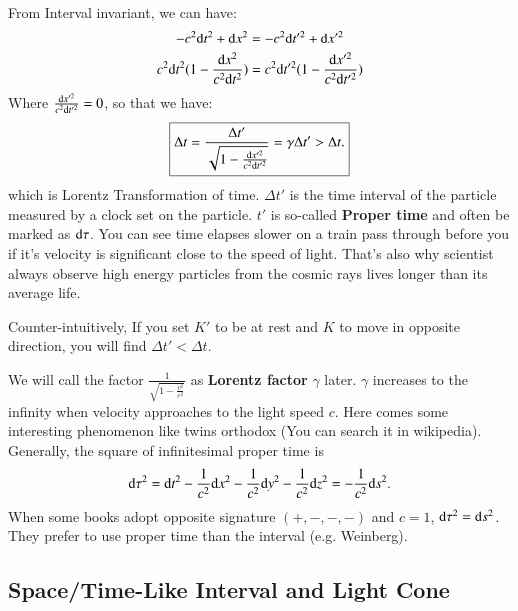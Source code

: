 \documentclass[openany,10pt]{book}
\theoremstyle{definition}
\theoremstyle{definition}
\theoremstyle{remark}
\begin{document}
From Interval invariant, we can have:
\begin{equation}
-c^2 {\rm d} t^2+{\rm d} x^2=-c^2{\rm d} t'^2+{\rm d} x'^2
\end{equation}
\begin{equation}
c^2{\rm d} t^2(1-\frac{{\rm d}x^2}{c^2 {\rm d}t^2})=c^2{\rm d}t'^2(1-\frac{{\rm d}x'^2}{c^2{\rm d}t'^2})
\end{equation}
Where $\frac{{\rm d}x'^2}{c^2{\rm d}t'^2}=0$, so that we have:
\begin{equation}\boxed{
\Delta t=\frac{\Delta t'}{\sqrt{1-\frac{{\rm d}x'^2}{c^2{\rm d}t'^2}}}=\gamma \Delta t'>\Delta t.}
\end{equation}
which is Lorentz Transformation of time. $\Delta t'$ is the time interval of the particle measured by a clock set on the particle. $t'$ is so-called {\bfseries Proper time} and often be marked as ${\rm d}\tau$.  You can see time elapses slower on a train pass through before you if it's velocity is significant close to the speed of light. That's also why scientist always observe high energy particles from the cosmic rays lives longer than its average life. 


Counter-intuitively, If you set $K'$ to be at rest and $K$ to move in opposite direction, you will find $\Delta t'<\Delta t$. 

We will call the factor $\frac1{\sqrt{1-\frac{v^2}{c^2}}}$ as {\bfseries Lorentz factor} $\gamma$ later. $\gamma$ increases to the infinity when velocity approaches to the light speed $c$.
Here comes some interesting phenomenon like twins orthodox (You can search it in wikipedia).\\
Generally, the square of infinitesimal proper time is 
\begin{equation}
    {\rm d} \tau^2={\rm d} t^2-\frac{1}{c^2}{\rm d} x^2-\frac{1}{c^2}{\rm d} y^2-\frac{1}{c^2}{\rm d} z^2=-\frac{1}{c^2}{\rm d}s^2.
\end{equation}
When some books adopt opposite signature $(+,-,-,-)$ and $c=1$, ${\rm d}\tau^2={\rm d}s^2$. They prefer to use proper time than the interval (e.g. Weinberg).


\subsection{Space/Time-Like Interval and Light Cone }
\end{document}
